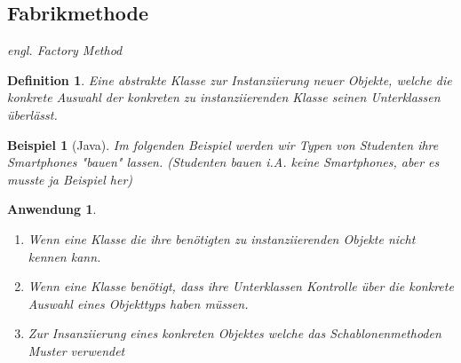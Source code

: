 \documentclass[a4paper]{article}
\theoremstyle{break}
\newtheorem{defi}{Definition}[section]
\newtheorem{ex}{Beispiel}[section]
\newtheorem{why}{Anwendung}[section]
\begin{document}
\newpage
\subsection{Fabrikmethode}

\textit{engl. Factory Method}

\begin{defi}
	Eine abstrakte Klasse zur Instanziierung neuer Objekte, welche die konkrete Auswahl der konkreten zu instanziierenden Klasse seinen Unterklassen überlässt.
\end{defi}

\begin{ex}[Java]
	Im folgenden Beispiel werden wir Typen von Studenten ihre Smartphones "bauen" lassen. (Studenten bauen i.A. keine Smartphones, aber es musste ja Beispiel her)

	
	
	
	
	
	
	
\end{ex}

\begin{why}
	\begin{enumerate}
		\item 	Wenn eine Klasse die ihre benötigten zu instanziierenden Objekte nicht kennen kann.
		\item Wenn eine Klasse benötigt, dass ihre Unterklassen Kontrolle über die konkrete Auswahl eines Objekttyps haben müssen.
		\item Zur Insanziierung eines konkreten Objektes welche das Schablonenmethoden Muster verwendet
	\end{enumerate}

	
\end{why}
\end{document}
